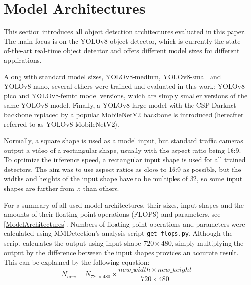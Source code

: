 \section{Model Architectures}


This section introduces all object detection architectures evaluated in this
paper.  The main focus is on the YOLOv8 object detector, which is currently the
state-of-the-art real-time object detector and offers different model sizes for
different applications.

Along with standard model sizes, YOLOv8-medium, YOLOv8-small and YOLOv8-nano,
several others were trained and evaluated in this work: YOLOv8-pico and
YOLOv8-femto model versions, which are simply smaller versions of the same
YOLOv8 model. Finally, a YOLOv8-large model with the CSP Darknet backbone
replaced by a popular MobileNetV2 backbone is introduced (hereafter referred to
as YOLOv8 MobileNetV2). 

Normally, a square shape is used as a model input, but standard traffic cameras
output a video of a rectangular shape, usually with the aspect ratio being 16:9.
To optimize the inference speed, a rectangular input shape is used for all
trained detectors. The aim was to use aspect ratios as close to 16:9 as
possible, but the widths and heights of the input shape have to be multiples of
32, so some input shapes are further from it than others.

For a summary of all used model architectures, their sizes, input shapes and the
amounts of their floating point operations (FLOPS) and parameters, see
\autoref{ModelArchitectures}. Numbers of floating point operations and
parameters were calculated using MMDetection's analysis script
\verb|get_flops.py|. Although the script calculates the output using input shape
$720 \times 480$, simply multiplying the output by the difference between the
input shapes provides an accurate result. This can be explained by the following
equation:
\begin{equation}
    N_{new} = N_{720 \times 480} \times \frac{new\_width \times new\_height}{720 \times 480}
\end{equation}


